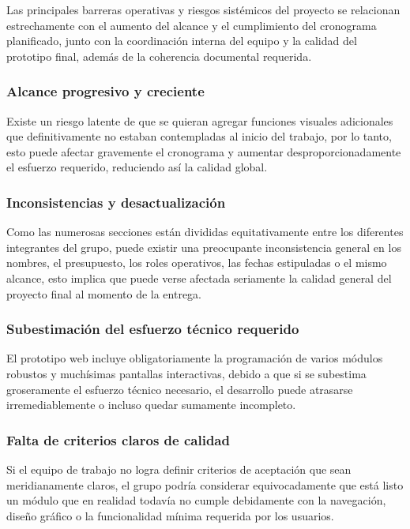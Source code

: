 \documentclass[11pt,spanish]{article}
\begin{document}
Las principales barreras operativas y riesgos sistémicos del proyecto se relacionan estrechamente con el aumento del alcance y el cumplimiento del cronograma planificado, junto con la coordinación interna del equipo y la calidad del prototipo final, además de la coherencia documental requerida.

\subsubsection{Alcance progresivo y creciente}

Existe un riesgo latente de que se quieran agregar funciones visuales adicionales que definitivamente no estaban contempladas al inicio del trabajo, por lo tanto, esto puede afectar gravemente el cronograma y aumentar desproporcionadamente el esfuerzo requerido, reduciendo así la calidad global.

\subsubsection{Inconsistencias y desactualización}

Como las numerosas secciones están divididas equitativamente entre los diferentes integrantes del grupo, puede existir una preocupante inconsistencia general en los nombres, el presupuesto, los roles operativos, las fechas estipuladas o el mismo alcance, esto implica que puede verse afectada seriamente la calidad general del proyecto final al momento de la entrega.

\subsubsection{Subestimación del esfuerzo técnico requerido}

El prototipo web incluye obligatoriamente la programación de varios módulos robustos y muchísimas pantallas interactivas, debido a que si se subestima groseramente el esfuerzo técnico necesario, el desarrollo puede atrasarse irremediablemente o incluso quedar sumamente incompleto.

\subsubsection{Falta de criterios claros de calidad}

Si el equipo de trabajo no logra definir criterios de aceptación que sean meridianamente claros, el grupo podría considerar equivocadamente que está listo un módulo que en realidad todavía no cumple debidamente con la navegación, diseño gráfico o la funcionalidad mínima requerida por los usuarios.
\end{document}
